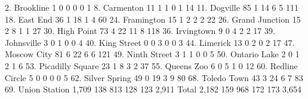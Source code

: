         2. Brookline {\VBAR}         1          0          0          0          0 {\VBAR}         1 
        8. Carmenton {\VBAR}        11          1          1          0          1 {\VBAR}        14 
        11. Dogville {\VBAR}        85          1         14          6          5 {\VBAR}       111 
        18. East End {\VBAR}        36          1         18          1          4 {\VBAR}        60 
      24. Framington {\VBAR}        15          1          2          2          2 {\VBAR}        22 
  26. Grand Junction {\VBAR}        15          2          8          1          1 {\VBAR}        27 
      30. High Point {\VBAR}        73          4         22         11          8 {\VBAR}       118 
      36. Irvingtown {\VBAR}         9          0          4          2          2 {\VBAR}        17 
      39. Johnsville {\VBAR}         3          0          1          0          0 {\VBAR}         4 
     40. King Street {\VBAR}         0          0          3          0          0 {\VBAR}         3 
        44. Limerick {\VBAR}        13          0          2          0          2 {\VBAR}        17 
     47. Moscow City {\VBAR}        81          6         22          6          6 {\VBAR}       121 
    49. Ninth Street {\VBAR}         3          1          1          0          0 {\VBAR}         5 
    50. Ontario Lake {\VBAR}         2          0          1          2          1 {\VBAR}         6 
53. Picadilly Square {\VBAR}        23          1          8          3          2 {\VBAR}        37 
      55. Queens Zoo {\VBAR}         6          0          5          1          0 {\VBAR}        12 
  60. Redline Circle {\VBAR}         5          0          0          0          0 {\VBAR}         5 
   62. Silver Spring {\VBAR}        49          0         19          3          9 {\VBAR}        80 
     68. Toledo Town {\VBAR}        43          3         24          6          7 {\VBAR}        83 
   69. Union Station {\VBAR}     1,709        138        813        128        123 {\VBAR}     2,911 
               Total {\VBAR}     2,182        159        968        172        173 {\VBAR}     3,654 
{\smallskip}
{\smallskip}

